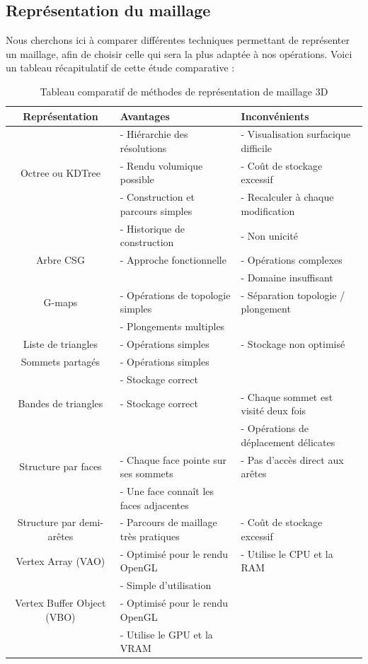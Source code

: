 \documentclass[a4paper]{memoir}
\begin{document}
			\subsection{Représentation du maillage}
				Nous cherchons ici à comparer différentes techniques permettant de représenter un maillage, afin de choisir celle qui sera la plus adaptée à nos opérations. Voici un tableau récapitulatif de cette étude comparative :
				\begin{table}[H]
					\begin{small}
						\begin{tabular}{| c | l | l |}
							\hline
							\textbf{Représentation} & \textbf{Avantages} & \textbf{Inconvénients}\\
							\hline
							 & - Hiérarchie des résolutions & - Visualisation surfacique difficile\\
							Octree ou KDTree & - Rendu volumique possible & - Coût de stockage excessif\\
							 & - Construction et parcours simples & - Recalculer à chaque modification\\
							\hline
							 & - Historique de construction & - Non unicité\\
							Arbre CSG & - Approche fonctionnelle & - Opérations complexes\\
							 &  & - Domaine insuffisant\\
							\hline
							G-maps & - Opérations de topologie simples & - Séparation topologie / plongement\\
							 & - Plongements multiples & \\
							\hline
							Liste de triangles & - Opérations simples & - Stockage non optimisé\\
							\hline
							Sommets partagés & - Opérations simples & \\
							 & - Stockage correct & \\
							\hline
							Bandes de triangles & - Stockage correct & - Chaque sommet est visité deux fois\\
							 &  & - Opérations de déplacement délicates\\
							\hline
							Structure par faces & - Chaque face pointe sur ses sommets & - Pas d'accès direct aux arêtes\\
							 & - Une face connaît les faces adjacentes & \\
							\hline
							Structure par demi-arêtes & - Parcours de maillage très pratiques & - Coût de stockage excessif\\
							\hline
							Vertex Array (VAO) & - Optimisé pour le rendu OpenGL & - Utilise le CPU et la RAM\\
							 & - Simple d'utilisation & \\
							\hline
							Vertex Buffer Object (VBO) & - Optimisé pour le rendu OpenGL & \\
							 & - Utilise le GPU et la VRAM & \\
							\hline
						\end{tabular}
					\end{small}
					\label{tab:maillage}
					\caption{Tableau comparatif de méthodes de représentation de maillage 3D}
				\end{table}
\end{document}
